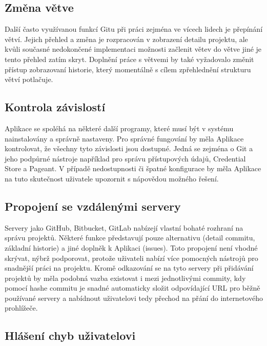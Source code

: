 \subsection{Změna větve}

Další často využívanou funkcí Gitu při práci zejména ve vícech lidech je přepínání větví. Jejich přehled a změna je rozpracován v zobrazení detailu projektu, ale kvůli současné nedokončené implementaci možnosti začlenit větev do větve jiné je tento přehled zatím skryt. Doplnění práce s větvemi by také vyžadovalo změnit přístup zobrazovaní historie, který momentálně s cílem zpřehlednění strukturu větví potlačuje.

\subsection{Kontrola závislostí}

Aplikace se spoléhá na některé další programy, které musí být v systému nainstalovány a správně nastaveny. Pro správné fungování by měla Aplikace kontrolovat, že všechny tyto závislosti jsou dostupné. Jedná se zejména o Git a jeho podpůrné nástroje například pro správu přístupových údajů, Credential Store a Pageant. V případě nedostupnosti či špatné konfigurace by měla Aplikace na tuto skutečnost uživatele upozornit s nápovědou možného řešení.

\subsection{Propojení se vzdálenými servery}

Servery jako GitHub, Bitbucket, GitLab nabízejí vlastní bohaté rozhraní na správu projektů. Některé funkce představují pouze alternativu (detail commitu, základní historie) a jiné doplněk k Aplikaci (issues). Toto propojení není vhodné skrývat, nýbrž podporovat, protože uživateli nabízí více pomocných nástrojů pro snadnější práci na projektu. Kromě odkazování se na tyto servery při přidávání projektů by měla podobná vazba existovat i mezi jednotlivými commity, kdy pomocí hashe commitu je snadné automaticky složit odpovídající URL pro běžně používané servery a nabídnout uživatelovi tedy přechod na přání do internetového prohlížeče.

\subsection{Hlášení chyb uživatelovi}

